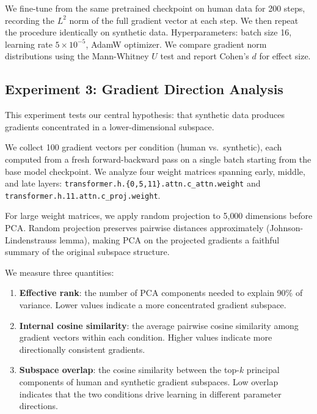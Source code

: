 We fine-tune \gptsmall from the same pretrained checkpoint on human data for 200 steps, recording the $L^2$ norm of the full gradient vector at each step. We then repeat the procedure identically on synthetic data. Hyperparameters: batch size 16, learning rate $5 \times 10^{-5}$, AdamW optimizer. We compare gradient norm distributions using the Mann-Whitney $U$ test and report Cohen's $d$ for effect size.

\subsection{Experiment 3: Gradient Direction Analysis}
\label{sec:exp3}

This experiment tests our central hypothesis: that synthetic data produces gradients concentrated in a lower-dimensional subspace.

 We collect 100 gradient vectors per condition (human vs.\ synthetic), each computed from a fresh forward-backward pass on a single batch starting from the base model checkpoint. We analyze four weight matrices spanning early, middle, and late layers: \texttt{transformer.h.\{0,5,11\}.attn.c\_attn.weight} and \texttt{transformer.h.11.attn.c\_proj.weight}.

 For large weight matrices, we apply random projection to 5{,}000 dimensions before PCA. Random projection preserves pairwise distances approximately (Johnson-Lindenstrauss lemma), making PCA on the projected gradients a faithful summary of the original subspace structure.

 We measure three quantities:
\begin{enumerate}[leftmargin=*,itemsep=0pt,topsep=0pt]
    \item \textbf{Effective rank}: the number of PCA components needed to explain 90\% of variance. Lower values indicate a more concentrated gradient subspace.
    \item \textbf{Internal cosine similarity}: the average pairwise cosine similarity among gradient vectors within each condition. Higher values indicate more directionally consistent gradients.
    \item \textbf{Subspace overlap}: the cosine similarity between the top-$k$ principal components of human and synthetic gradient subspaces. Low overlap indicates that the two conditions drive learning in different parameter directions.
\end{enumerate}

